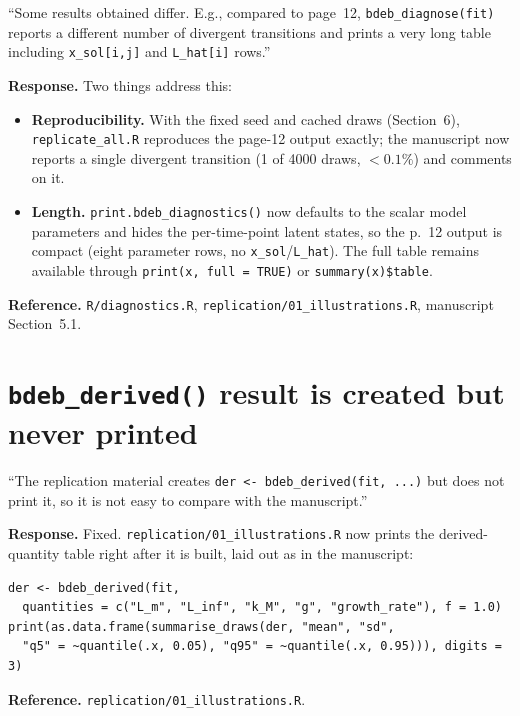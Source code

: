 \documentclass[11pt,a4paper]{article}
\newcommand{\code}[1]{\texttt{#1}}
\begin{document}
\begin{displayquote}
``Some results obtained differ. E.g., compared to page~12,
\code{bdeb\_diagnose(fit)} reports a different number of divergent
transitions and prints a very long table including \code{x\_sol[i,j]}
and \code{L\_hat[i]} rows.''
\end{displayquote}

\textbf{Response.} Two things address this:
\begin{itemize}[nosep]
\item \textbf{Reproducibility.} With the fixed seed and cached draws
  (Section~6), \code{replicate\_all.R} reproduces the page-12 output
  exactly; the manuscript now reports a single divergent transition
  (1 of 4000 draws, $<0.1\%$) and comments on it.
\item \textbf{Length.} \code{print.bdeb\_diagnostics()} now defaults to
  the scalar model parameters and hides the per-time-point latent
  states, so the p.~12 output is compact (eight parameter rows, no
  \code{x\_sol}/\code{L\_hat}). The full table remains available through
  \code{print(x, full = TRUE)} or \code{summary(x)\$table}.
\end{itemize}

\textbf{Reference.} \code{R/diagnostics.R},
\code{replication/01\_illustrations.R}, manuscript Section~5.1.

\section{\code{bdeb\_derived()} result is created but never printed}

\begin{displayquote}
``The replication material creates \code{der <- bdeb\_derived(fit, ...)}
but does not print it, so it is not easy to compare with the
manuscript.''
\end{displayquote}

\textbf{Response.} Fixed. \code{replication/01\_illustrations.R} now
prints the derived-quantity table right after it is built, laid out as in
the manuscript:
\begin{Verbatim}[fontsize=\small]
der <- bdeb_derived(fit,
  quantities = c("L_m", "L_inf", "k_M", "g", "growth_rate"), f = 1.0)
print(as.data.frame(summarise_draws(der, "mean", "sd",
  "q5" = ~quantile(.x, 0.05), "q95" = ~quantile(.x, 0.95))), digits = 3)
\end{Verbatim}

\textbf{Reference.} \code{replication/01\_illustrations.R}.
\end{document}
